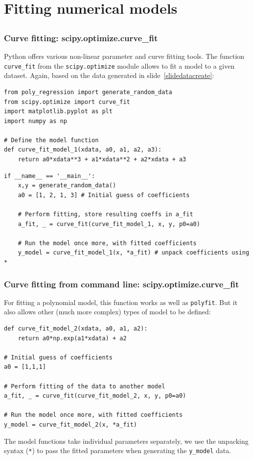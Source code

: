 \section{Fitting numerical models}
\subsection*{}

{\nologo
\begin{frame}[fragile]
  \frametitle{Curve fitting: scipy.optimize.curve\_fit}
  Python offers various non-linear parameter and curve fitting tools. The function \lstinline$curve_fit$ from the \lstinline$scipy.optimize$ module allows to fit a model to a given dataset. Again, based on the data generated in slide~\ref{slidedatacreate}:
    \begin{lstlisting}
from poly_regression import generate_random_data
from scipy.optimize import curve_fit
import matplotlib.pyplot as plt
import numpy as np

# Define the model function
def curve_fit_model_1(xdata, a0, a1, a2, a3):
    return a0*xdata**3 + a1*xdata**2 + a2*xdata + a3
    \end{lstlisting}
    \begin{lstlisting}
if __name__ == '__main__':
    x,y = generate_random_data()
    a0 = [1, 2, 1, 3] # Initial guess of coefficients
    
    # Perform fitting, store resulting coeffs in a_fit
    a_fit, _ = curve_fit(curve_fit_model_1, x, y, p0=a0)
    
    # Run the model once more, with fitted coefficients
    y_model = curve_fit_model_1(x, *a_fit) # unpack coefficients using *
    \end{lstlisting}
\end{frame}
}

\begin{frame}[fragile]
  \frametitle{Curve fitting from command line: scipy.optimize.curve\_fit}
  For fitting a polynomial model, this function works as well as \lstinline|polyfit|. But it also allows other (much more complex) types of model to be defined:
    \begin{lstlisting}
def curve_fit_model_2(xdata, a0, a1, a2):
    return a0*np.exp(a1*xdata) + a2

# Initial guess of coefficients
a0 = [1,1,1]

# Perform fitting of the data to another model
a_fit, _ = curve_fit(curve_fit_model_2, x, y, p0=a0)

# Run the model once more, with fitted coefficients
y_model = curve_fit_model_2(x, *a_fit)
    \end{lstlisting}
    The model functions take individual parameters separately, we use the unpacking syntax (\lstinline$*$) to pass the fitted parameters when generating the \lstinline$y_model$ data.
\end{frame}


